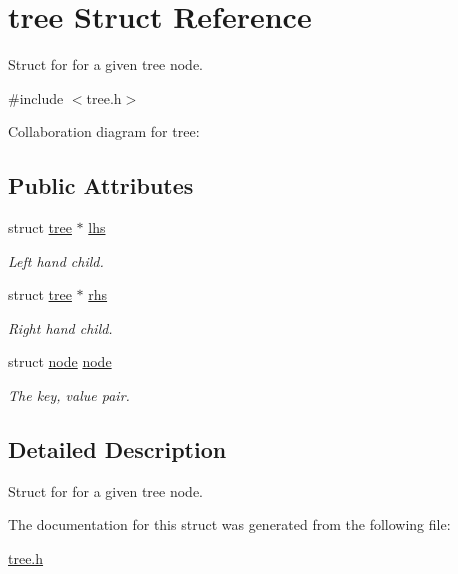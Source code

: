 \hypertarget{structtree}{}\section{tree Struct Reference}
\label{structtree}


Struct for for a given tree node.  




{\ttfamily \#include $<$tree.\+h$>$}



Collaboration diagram for tree\+:
\subsection*{Public Attributes}
\begin{DoxyCompactItemize}
\item 
\mbox{\label{structtree_a719e1c75f69b2b6ce4fc64400929a756}} 
struct \hyperlink{structtree}{tree} $\ast$ \hyperlink{structtree_a719e1c75f69b2b6ce4fc64400929a756}{lhs}
\begin{DoxyCompactList}\small\item\em Left hand child. \end{DoxyCompactList}\item 
\mbox{\label{structtree_a15afaacf07b9edc974ed7bf97533e17e}} 
struct \hyperlink{structtree}{tree} $\ast$ \hyperlink{structtree_a15afaacf07b9edc974ed7bf97533e17e}{rhs}
\begin{DoxyCompactList}\small\item\em Right hand child. \end{DoxyCompactList}\item 
\mbox{\label{structtree_a479c5bd6c7d67b4896330760c2b1a12d}} 
struct \hyperlink{structnode}{node} \hyperlink{structtree_a479c5bd6c7d67b4896330760c2b1a12d}{node}
\begin{DoxyCompactList}\small\item\em The key, value pair. \end{DoxyCompactList}\end{DoxyCompactItemize}


\subsection{Detailed Description}
Struct for for a given tree node. 

The documentation for this struct was generated from the following file\+:\begin{DoxyCompactItemize}
\item 
\hyperlink{tree_8h}{tree.\+h}\end{DoxyCompactItemize}
